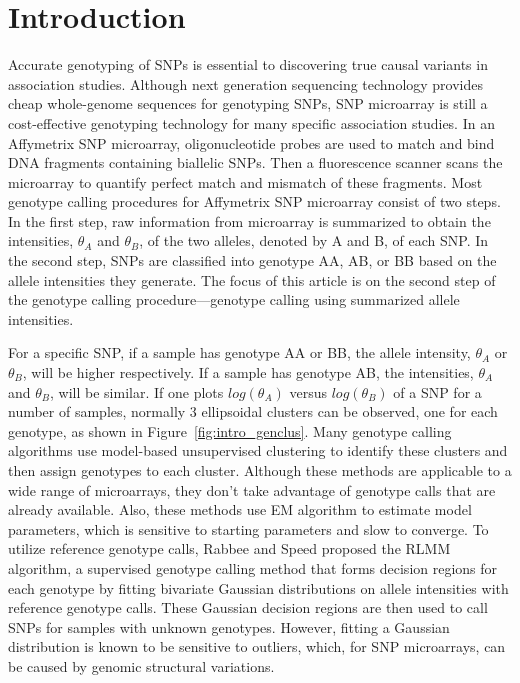 \documentclass{scrartcl}
\begin{document}
\section{Introduction}

\par
Accurate genotyping of SNPs is essential to discovering true causal variants
in association studies.
Although next generation sequencing technology provides cheap whole-genome
sequences for genotyping SNPs, SNP microarray is still a cost-effective
genotyping technology for many specific association studies.
In an Affymetrix SNP microarray, oligonucleotide probes are used to match and
bind DNA fragments containing biallelic SNPs.
Then a fluorescence scanner scans the microarray to quantify perfect 
match and mismatch of these fragments.
Most genotype calling procedures for Affymetrix SNP microarray consist of
two steps.
In the first step, raw information from microarray is summarized to obtain
the intensities, $\theta_A$ and $\theta_B$, of the two alleles, denoted
by A and B, of each SNP.
In the second step, SNPs are classified into genotype AA, AB, or BB based on
the allele intensities they generate.
The focus of this article is on the second step of the genotype calling
procedure---genotype calling using summarized allele intensities.

\par
For a specific SNP, if a sample has genotype AA or BB, the allele intensity,
$\theta_A$ or $\theta_B$, will be higher respectively. 
If a sample has genotype AB, the intensities, $\theta_A$ and $\theta_B$,
will be similar.
If one plots $log(\theta_A)$ versus $log(\theta_B)$ of a SNP for a number of
samples, normally 3 ellipsoidal clusters can be observed, one for each
genotype, as shown in Figure~\ref{fig:intro_genclus}.
Many genotype calling algorithms use model-based unsupervised clustering
to identify these clusters and then assign genotypes to each cluster.
Although these methods are applicable to a wide range of microarrays, they
don't take advantage of genotype calls that are already available.
Also, these methods use EM algorithm to estimate model parameters, which is
sensitive to starting parameters and slow to converge.
To utilize reference genotype calls, Rabbee and Speed proposed the RLMM
algorithm, a supervised genotype calling method that forms
decision regions for each genotype by fitting bivariate Gaussian
distributions on allele intensities with reference genotype calls.
These Gaussian decision regions are then used to call SNPs for samples with
unknown genotypes.
However, fitting a Gaussian distribution is known to be sensitive to outliers,
which, for SNP microarrays, can be caused by genomic structural variations.
\end{document}
